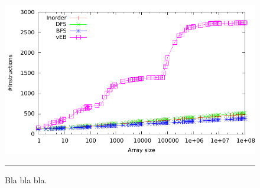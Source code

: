 \begin{figure}[htbp]
	\centering
		\includegraphics[width=\textwidth]{./Figures/Project1/Instructions.pdf}
		\rule{35em}{0.5pt}
	\caption[Instructions]{
	Bla bla bla.
	}
	\label{fig:Instructions}
\end{figure}


